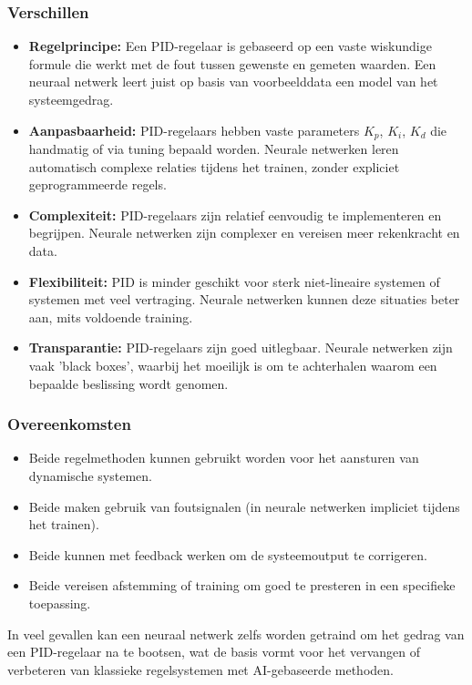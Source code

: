 \subsubsection{Verschillen}
\begin{itemize}
  \item \textbf{Regelprincipe:} Een PID-regelaar is gebaseerd op een vaste wiskundige formule die werkt met de fout tussen gewenste en gemeten waarden. Een neuraal netwerk leert juist op basis van voorbeelddata een model van het systeemgedrag.
  \item \textbf{Aanpasbaarheid:} PID-regelaars hebben vaste parameters \(K_p\), \(K_i\), \(K_d\) die handmatig of via tuning bepaald worden. Neurale netwerken leren automatisch complexe relaties tijdens het trainen, zonder expliciet geprogrammeerde regels. 
  \item \textbf{Complexiteit:} PID-regelaars zijn relatief eenvoudig te implementeren en begrijpen. Neurale netwerken zijn complexer en vereisen meer rekenkracht en data.
  \item \textbf{Flexibiliteit:} PID is minder geschikt voor sterk niet-lineaire systemen of systemen met veel vertraging. Neurale netwerken kunnen deze situaties beter aan, mits voldoende training.
  \item \textbf{Transparantie:} PID-regelaars zijn goed uitlegbaar. Neurale netwerken zijn vaak 'black boxes', waarbij het moeilijk is om te achterhalen waarom een bepaalde beslissing wordt genomen.
\end{itemize}
\subsubsection{Overeenkomsten}
\begin{itemize}
  \item Beide regelmethoden kunnen gebruikt worden voor het aansturen van dynamische systemen.
  \item Beide maken gebruik van foutsignalen (in neurale netwerken impliciet tijdens het trainen).
  \item Beide kunnen met feedback werken om de systeemoutput te corrigeren.
  \item Beide vereisen afstemming of training om goed te presteren in een specifieke toepassing.
\end{itemize}
In veel gevallen kan een neuraal netwerk zelfs worden getraind om het gedrag van een PID-regelaar na te bootsen, wat de basis vormt voor het vervangen of verbeteren van klassieke regelsystemen met AI-gebaseerde methoden.
